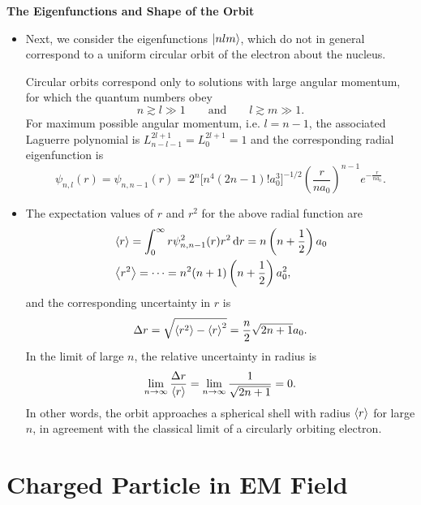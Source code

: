 \documentclass[11pt, a4paper]{article}
\newcommand{\diff}{\mathop{}\!\mathrm{d}} %
\newcommand{\eqtext}[1]{\qquad \text{#1} \qquad}
\newcommand{\p}{\psi}  %
\begin{document}
\textbf{The Eigenfunctions and Shape of the Orbit}
\begin{itemize}
	\item Next, we consider the eigenfunctions $ \ket{nlm} $, which do not in general correspond to a uniform circular orbit of the electron about the nucleus. 
	
	Circular orbits correspond only to solutions with large angular momentum, for which the quantum numbers obey
	\begin{equation*}
		n \gtrsim l \gg 1 \eqtext{and} l \gtrsim m \gg 1.
	\end{equation*}
	For maximum possible angular momentum, i.e. $ l = n - 1 $, the associated Laguerre polynomial is $ L_{n - l - 1}^{2l + 1} = L_{0}^{2l + 1} = 1 $ and the corresponding radial eigenfunction is
	\begin{equation*}
		\p_{n, l}(r) = \p_{n, n-1}(r) = 2^{n}\big[n^{4}(2n-1)!a_{0}^{3}\big]^{-1/2}\left(\frac{r}{na_{0}}\right)^{n-1}e^{-\frac{r}{na_{0}}}.
	\end{equation*}

	\item The expectation values of $ r $ and $ r^{2} $ for the above radial function are
	\begin{align*}
		& \ev{r} = \int_{0}^{\infty}r \p_{n, n-1}^{2}(r)r^{2}\diff r = n\left(n+\frac{1}{2}\right)a_{0}\\
		& \ev{r^{2}} = \cdots =  n^{2}(n+1)\left(n + \frac{1}{2}\right)a_{0}^{2},
	\end{align*}
	and the corresponding uncertainty in $ r $ is
	\begin{equation*}
		\Delta r = \sqrt{\ev{r^{2}} - \ev{r}^{2}} = \frac{n}{2}\sqrt{2n + 1}a_{0}.
	\end{equation*}
	In the limit of large $ n $, the relative uncertainty in radius is
	\begin{equation*}
		\lim_{n \to \infty} \frac{\Delta r}{\ev{r}} = \lim_{n \to \infty} \frac{1}{\sqrt{2n + 1}} = 0.
	\end{equation*}
	In other words, the orbit approaches a spherical shell with radius $ \ev{r} $ for large $ n $, in agreement with the classical limit of a circularly orbiting electron.
	
\end{itemize}

	
\newpage
\section{Charged Particle in EM Field}
\end{document}
